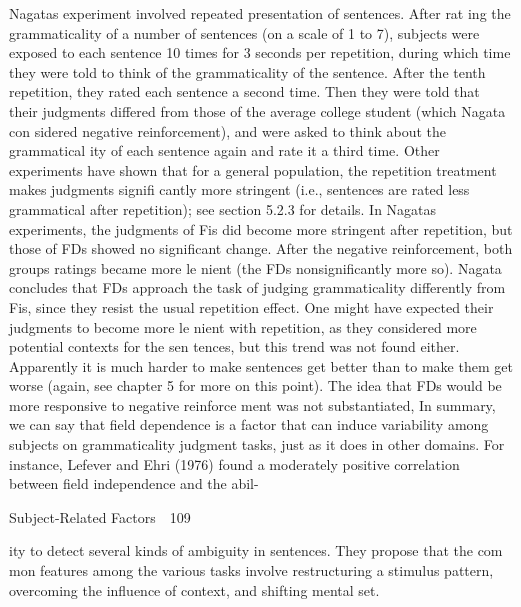 \begin{styleTextbody}
Nagata{\textquotesingle}s experiment involved repeated presentation of sentences. After rat\- ing the grammaticality of a number of sentences (on a scale of 1 to 7), subjects were exposed to each sentence 10 times for 3 seconds per repetition, during which time they were told to think of the grammaticality of the sentence. After the tenth repetition, they rated each sentence a second time. Then they were told that their judgments differed from those of the average college student (which Nagata con\- sidered negative reinforcement), and were asked to think about the grammatical\- ity of each sentence again and rate it a third time. Other experiments have shown that for a general population, the repetition treatment makes judgments signifi\- cantly more stringent (i.e., sentences are rated less grammatical after repetition); see section 5.2.3 for details. In Nagata{\textquotesingle}s experiments, the judgments of Fis did become more stringent after repetition, but those of FDs showed no significant change. After the negative reinforcement, both groups{\textquotesingle} ratings became more le\- nient (the FDs{\textquotesingle} nonsignificantly more so). Nagata concludes that FDs approach the task of judging grammaticality differently from Fis, since they resist the usual repetition effect. One might have expected their judgments to become more le\- nient with repetition, as they considered more potential contexts for the sen\- tences, but this trend was not found either. Apparently it is much harder to make sentences get better than to make them get worse (again, see chapter 5 for more on this point). The idea that FDs would be more responsive to negative reinforce\- ment was not substantiated, In summary, we can say that field dependence is a factor that can induce variability among subjects on grammaticality judgment tasks, just as it does in other domains. For instance, Lefever and Ehri (1976) found a moderately positive correlation between field independence and the abil-
\end{styleTextbody}


\clearpage\setcounter{page}{1}\begin{styleStandard}
Subject-Related Factors\ \ 109
\end{styleStandard}


\begin{styleTextbody}
ity to detect several kinds of ambiguity in sentences. They propose that the com\- mon features among the various tasks involve restructuring a stimulus pattern, overcoming the influence of context, and shifting mental set.
\end{styleTextbody}


